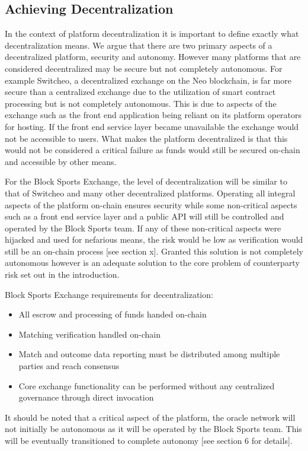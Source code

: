 \documentclass{article}
\begin{document}
	\clearpage
	\subsection{Achieving Decentralization}
In the context of platform decentralization it is important to define exactly what decentralization means. We argue that there are two primary aspects of a decentralized platform, security and autonomy. However many platforms that are considered decentralized may be secure but not completely autonomous. For example Switcheo, a decentralized exchange on the Neo blockchain, is far more secure than a centralized exchange due to the utilization of smart contract processing but is not completely autonomous. This is due to aspects of the exchange such as the front end application being reliant on its platform operators for hosting. If the front end service layer became unavailable the exchange would not be accessible to users. What makes the platform decentralized is that this would not be considered a critical failure as funds would still be secured on-chain and accessible by other means. 

For the Block Sports Exchange, the level of decentralization will be similar to that of Switcheo and many other decentralized platforms. Operating all integral aspects of the platform on-chain ensures security while some non-critical aspects such as a front end service layer and a public API will still be controlled and operated by the Block Sports team. If any of these non-critical aspects were hijacked and used for nefarious means, the risk would be low as verification would still be an on-chain process [see section x]. Granted this solution is not completely autonomous however is an adequate solution to the core problem of counterparty risk set out in the introduction. 

Block Sports Exchange requirements for decentralization:
\begin{itemize}
	\item All escrow and processing of funds handed on-chain
	\item Matching verification handled on-chain
	\item Match and outcome data reporting must be distributed among multiple parties and reach consensus
	\item Core exchange functionality can be performed without any centralized governance through direct invocation  
\end{itemize}

It should be noted that a critical aspect of the platform, the oracle network will not initially be autonomous as it will be operated by the Block Sports team. This will be eventually transitioned to complete autonomy [see section 6 for details]. 
		
\end{document}
